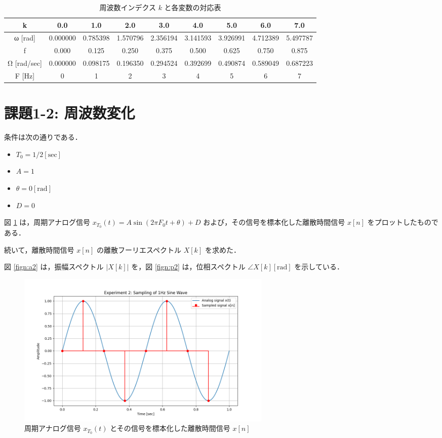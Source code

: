 \documentclass[fleqn, a4paper. 12pt]{jsarticle}
\begin{document}
    \begin{table}[!h]
      \centering
      \caption{周波数インデクス $k$ と各変数の対応表}
      \begin{tabular}{c|c|c|c|c|c|c|c|c}
        k & 0.0 & 1.0 & 2.0 & 3.0 & 4.0 & 5.0 & 6.0 & 7.0 \\
        \hline
        ω [rad] & 0.000000 & 0.785398 & 1.570796 & 2.356194 & 3.141593 & 3.926991 & 4.712389 & 5.497787 \\
        f & 0.000 & 0.125 & 0.250 & 0.375 & 0.500 & 0.625 & 0.750 & 0.875 \\
        Ω [rad/sec] & 0.000000 & 0.098175 & 0.196350 & 0.294524 & 0.392699 & 0.490874 & 0.589049 & 0.687223 \\
        F [Hz] & 0 & 1 & 2 & 3 & 4 & 5 & 6 & 7 
      \end{tabular}
      \label{tab:1}
    \end{table}

  
  \newpage
  \section*{課題1-2: 周波数変化}

  条件は次の通りである．

  \begin{itemize}
    \item $T_0 = 1/2 [\mathrm{sec}]$
    \item $A = 1$
    \item $\theta = 0 [\mathrm{rad}]$
    \item $D = 0$
  \end{itemize}

  図 \ref{fig:s2} は，周期アナログ信号 $x_{T_0}(t)=A \sin \left(2 \pi F_0 t+\theta\right)+D$ および，その信号を標本化した離散時間信号 $x[n]$ をプロットしたものである．

  続いて，離散時間信号 $x[n]$ の離散フーリエスペクトル $X[k]$ を求めた．

  図 \ref{fign:a2} は，振幅スペクトル $|X[k]|$ を，図 \ref{fign:p2} は，位相スペクトル $\angle X[k][\mathrm{rad}]$ を示している．

  \begin{figure}[!h]
    \centering
    \includegraphics[width=0.6\textwidth]{sampling_experiment_2.png}
    \caption{周期アナログ信号 $x_{T_0}(t)$ とその信号を標本化した離散時間信号 $x[n]$}
    \label{fig:s2}
  \end{figure}
\end{document}
